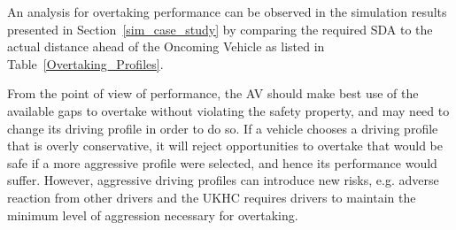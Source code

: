 An analysis for overtaking performance can be observed in the simulation results presented in Section~\ref{sim_case_study} by comparing the required SDA to the actual distance ahead of the Oncoming Vehicle as listed in Table~\ref{Overtaking_Profiles}. 

From the point of view of performance, the AV should make best use of the available gaps to overtake without violating the safety property, and may need to change its driving profile in order to do so. 
%
If a vehicle chooses a driving profile that is overly conservative, it will reject opportunities to overtake that would be safe if a more aggressive profile were selected, and hence its performance would suffer. 
%
However, aggressive driving profiles can introduce new risks, e.g. adverse reaction from other drivers and the UKHC requires drivers to maintain the minimum level of aggression necessary for overtaking.


